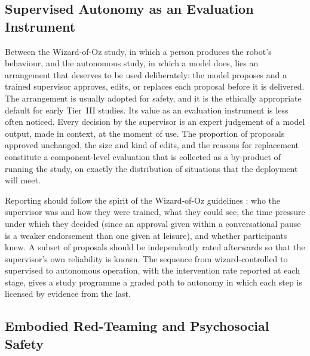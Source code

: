\subsection{Supervised Autonomy as an Evaluation Instrument}
\label{sec:lloz}

Between the Wizard-of-Oz study, in which a person produces the robot's
behaviour, and the autonomous study, in which a model does, lies an
arrangement that deserves to be used deliberately: the model proposes and a
trained supervisor approves, edits, or replaces each proposal before it is
delivered. The arrangement is usually adopted for safety, and it is the
ethically appropriate default for early Tier~III studies. Its value as an
evaluation instrument is less often noticed. Every decision by the supervisor
is an expert judgement of a model output, made in context, at the moment of
use. The proportion of proposals approved unchanged, the size and kind of
edits, and the reasons for replacement constitute a component-level
evaluation that is collected as a by-product of running the study, on
exactly the distribution of situations that the deployment will meet.

Reporting should follow the spirit of the Wizard-of-Oz guidelines
\cite{riek2012wizard}: who the supervisor was and how they were trained, what
they could see, the time pressure under which they decided (since an
approval given within a conversational pause is a weaker endorsement than
one given at leisure), and whether participants knew. A subset of
proposals should be independently rated afterwards so that the supervisor's
own reliability is known. The sequence from wizard-controlled to supervised
to autonomous operation, with the intervention rate reported at each stage,
gives a study programme a graded path to autonomy in which each step is
licensed by evidence from the last.

\subsection{Embodied Red-Teaming and Psychosocial Safety}
\label{sec:redteam}

